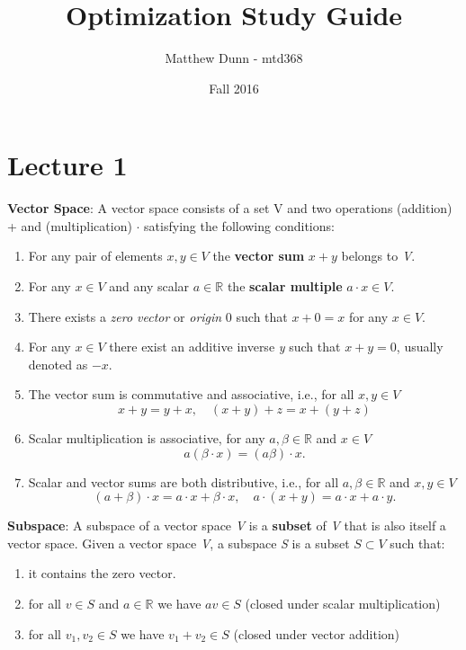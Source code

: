 \documentclass[12pt]{article}
\title{Optimization Study Guide}
\author{Matthew Dunn - mtd368}
\date{Fall 2016}
\newenvironment{definition}[2][Definition]{\begin{trivlist}
\item[\hskip \labelsep {\bfseries #1}\hskip \labelsep {\bfseries #2}]}{\end{trivlist}}
\begin{document}
\maketitle

\section{Lecture 1}

\begin{definition}{1.0} \textbf{Vector Space}: A vector space consists of a set V and two operations (addition) + and (multiplication) $\cdot$ satisfying the following conditions:

\begin{enumerate}
    \item For any pair of elements \(x,y\in V\) the \textbf{vector sum} \(x+y\) belongs to \emph{V}.
    \item For any \(x\in V\) and any scalar \(a\in \mathbb{R}\) the \textbf{scalar multiple} \(a \cdot x \in V\).
    \item There exists a \emph{zero vector} or \emph{origin} 0 such that \(x+0=x\) for any \(x \in V\).
    \item For any \(x\in V\) there exist an additive inverse \emph{y} such that \(x+y=0\), usually denoted as \(-x\).
    \item The vector sum is commutative and associative, i.e., for all \(x,y\in V\)
    \[x+y=y+x, \quad (x+y)+z=x+(y+z)\]
    \item Scalar multiplication is associative, for any \(a,\beta \in \mathbb{R}\) and \(x\in V\)
    \[a(\beta \cdot x) = (a\beta)\cdot x.\]
    \item Scalar and vector sums are both distributive, i.e., for all \(a,\beta \in \mathbb{R}\) and \(x,y\in V\)
    \[(a+\beta)\cdot x = a \cdot x + \beta \cdot x, \quad a \cdot(x+y) = a\cdot x + a \cdot y.\]
\end{enumerate}

\end{definition}

\begin{definition}{1.1} \textbf{Subspace}: A subspace of a vector space \emph{V} is a \textbf{subset} of \emph{V} that is also itself a vector space. Given a vector space \emph{V}, a subspace \emph{S} is a subset \(S \subset V\) such that: 
\begin{enumerate}
    \item it contains the zero vector.
    \item for all \(v\in S\) and \(a\in \mathbb{R}\) we have \(av \in S\) (closed under scalar multiplication)
    \item for all \(v_1, v_2 \in S\) we have \(v_1 + v_2 \in S\) (closed under vector addition)
\end{enumerate}
\end{definition}
\end{document}
